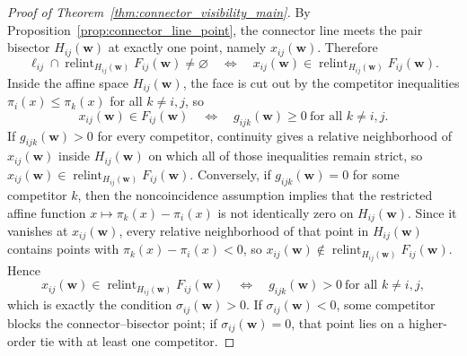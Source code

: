 \documentclass[preprint,12pt]{elsarticle}
\newcommand{\weights}{\mathbf{w}}
\newcommand{\relint}{\operatorname{relint}}
\begin{document}
\begin{proof}[Proof of Theorem~\ref{thm:connector_visibility_main}]
By Proposition~\ref{prop:connector_line_point}, the connector line meets the
pair bisector $H_{ij}(\weights)$ at exactly one point, namely
$x_{ij}(\weights)$. Therefore
\begin{equation}
    \ell_{ij}\cap \relint_{H_{ij}(\weights)} F_{ij}(\weights)\neq\varnothing
    \quad\Longleftrightarrow\quad
    x_{ij}(\weights)\in\relint_{H_{ij}(\weights)} F_{ij}(\weights).
\end{equation}
Inside the affine space $H_{ij}(\weights)$, the face is cut out by the
competitor inequalities $\pi_i(x)\le \pi_k(x)$ for all $k\neq i,j$, so
\begin{equation}
    x_{ij}(\weights)\in F_{ij}(\weights)
    \quad\Longleftrightarrow\quad
    g_{ijk}(\weights)\ge 0\ \text{for all }k\neq i,j.
\end{equation}
If $g_{ijk}(\weights)>0$ for every competitor, continuity gives a relative
neighborhood of $x_{ij}(\weights)$ inside $H_{ij}(\weights)$ on which all of
those inequalities remain strict, so
$x_{ij}(\weights)\in\relint_{H_{ij}(\weights)} F_{ij}(\weights)$. Conversely,
if $g_{ijk}(\weights)=0$ for some competitor $k$, then the noncoincidence
assumption implies that the restricted affine function
$x\mapsto \pi_k(x)-\pi_i(x)$ is not identically zero on $H_{ij}(\weights)$.
Since it vanishes at $x_{ij}(\weights)$, every relative neighborhood of that
point in $H_{ij}(\weights)$ contains points with $\pi_k(x)-\pi_i(x)<0$, so
$x_{ij}(\weights)\notin\relint_{H_{ij}(\weights)} F_{ij}(\weights)$. Hence
\begin{equation}
    x_{ij}(\weights)\in\relint_{H_{ij}(\weights)} F_{ij}(\weights)
    \quad\Longleftrightarrow\quad
    g_{ijk}(\weights)>0\ \text{for all }k\neq i,j,
\end{equation}
which is exactly the condition $\sigma_{ij}(\weights)>0$. If
$\sigma_{ij}(\weights)<0$, some competitor blocks the connector--bisector point;
if $\sigma_{ij}(\weights)=0$, that point lies on a higher-order tie with at
least one competitor.
\end{proof}
\end{document}
